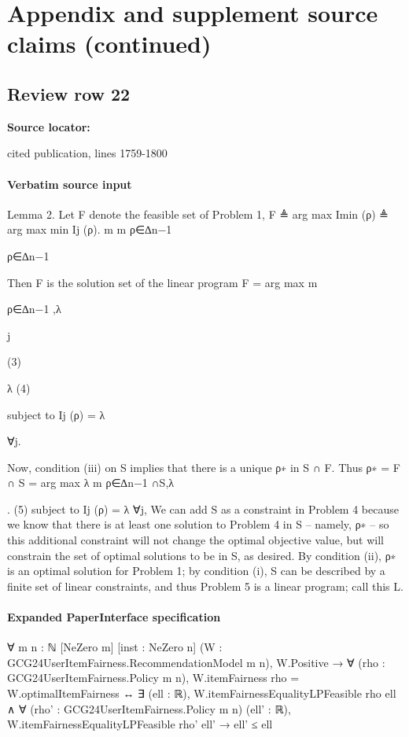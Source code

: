 \documentclass[10pt]{article}
\begin{document}
\section*{Appendix and supplement source claims (continued)}
\subsection*{Review row 22}
\textbf{Source locator:} {\footnotesize\raggedright cited publication, lines 1759-\allowbreak{}1800\par}
\paragraph{Verbatim source input}
\begin{ReviewVerbatim}
Lemma 2. Let F denote the feasible set of Problem 1,
F ≜ arg max
Imin (ρ) ≜ arg max
min Ij (ρ).
m
m
ρ∈∆n−1

ρ∈∆n−1

Then F is the solution set of the linear program
F = arg max
m

ρ∈∆n−1 ,λ

j

(3)

λ
(4)

subject to Ij (ρ) = λ

∀j.

Now, condition (iii) on S implies that there is a unique ρ∗ in S ∩ F. Thus
ρ∗ = F ∩ S = arg
max
λ
m
ρ∈∆n−1 ∩S,λ

.
(5)
subject to Ij (ρ) = λ ∀j,
We can add S as a constraint in Problem 4 because we know that there is at least one solution to
Problem 4 in S – namely, ρ∗ – so this additional constraint will not change the optimal objective
value, but will constrain the set of optimal solutions to be in S, as desired.
By condition (ii), ρ∗ is an optimal solution for Problem 1; by condition (i), S can be described by a
finite set of linear constraints, and thus Problem 5 is a linear program; call this L.
\end{ReviewVerbatim}



\paragraph{Expanded PaperInterface specification}
\begin{ReviewVerbatim}
∀ {m n : ℕ} [NeZero m] [inst : NeZero n] (W : GCG24UserItemFairness.RecommendationModel m n),
  W.Positive →
    ∀ (rho : GCG24UserItemFairness.Policy m n),
      W.itemFairness rho = W.optimalItemFairness ↔
        ∃ (ell : ℝ),
          W.itemFairnessEqualityLPFeasible rho ell ∧
            ∀ (rho' : GCG24UserItemFairness.Policy m n) (ell' : ℝ),
              W.itemFairnessEqualityLPFeasible rho' ell' → ell' ≤ ell
\end{ReviewVerbatim}
\end{document}
